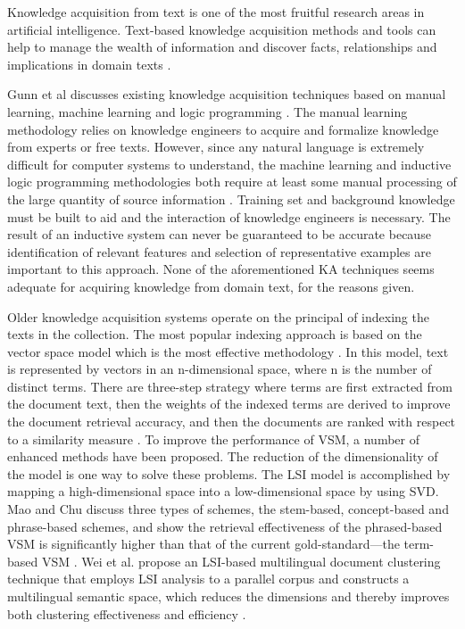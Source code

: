 \documentclass{elsarticle}
\begin{document}
Knowledge acquisition from text is one of the most fruitful research
areas in artificial intelligence. Text-based knowledge acquisition
methods and tools can help to manage the wealth of information and
discover facts, relationships and implications in domain texts
\cite{Hahn2000,Gunn1999}. 

Gunn et al discusses existing knowledge acquisition techniques based
on manual learning, machine learning and logic programming \cite{Gunn1999}. The
manual learning methodology relies on knowledge engineers to acquire
and formalize knowledge from experts or free texts. However, since any
natural language is extremely difficult for computer systems to
understand, the machine learning and inductive logic programming
methodologies both require at least some manual processing of the
large quantity of source information
\cite{matwin:tac,Richardson1997}. Training set and background
knowledge must be built to aid and the interaction of knowledge
engineers is necessary. The result of an inductive system can never be
guaranteed to be accurate because identification of relevant features
and selection of representative examples are important to this
approach. None of the aforementioned KA techniques seems adequate for
acquiring knowledge from domain text, for the reasons given. 

Older knowledge acquisition systems operate on the principal of
indexing the texts in the collection. The most popular indexing
approach is based on the vector space model
\cite{361220,salton1975vsm} which is the most effective methodology \cite{215383}. In this model,
text is represented by vectors in an n-dimensional space, where n is
the number of distinct terms. There are three-step strategy where
terms are first extracted from the document text, then the weights of
the indexed terms are derived to improve the document retrieval
accuracy, and then the documents are ranked with respect to a
similarity measure \cite{Raghavan1986}. To improve the performance of
VSM, a number of enhanced methods have been proposed. The reduction of
the dimensionality of the model is one way to solve these
problems. The LSI model is accomplished by mapping a high-dimensional
space into a low-dimensional space by using SVD. Mao and Chu discuss three types of schemes, the stem-based, concept-based
and phrase-based schemes, and show the retrieval effectiveness of the
phrased-based VSM is significantly higher than that of the current
gold-standard—the term-based VSM \cite{Mao2007}. Wei et
al. propose an LSI-based multilingual document clustering technique
that employs LSI analysis to a parallel corpus and constructs a
multilingual semantic space, which reduces the dimensions and thereby
improves both clustering effectiveness and efficiency \cite{Wei2008}.
\end{document}
